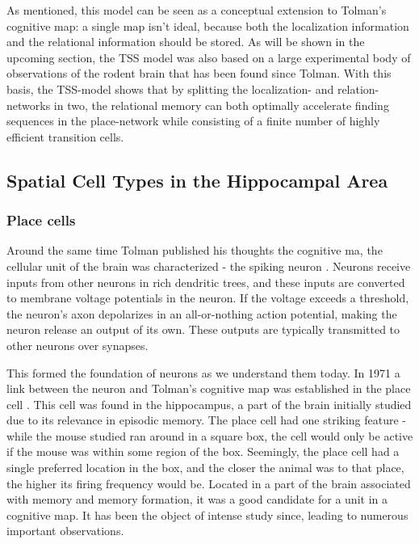 \documentclass{article}
\begin{document}
    As mentioned, this model can be seen as a conceptual extension to Tolman's cognitive map: a single map isn't ideal, because both the localization information and the relational information should be stored. As will be shown in the upcoming section, the TSS model was also based on a large experimental body of observations of the rodent brain that has been found since Tolman. With this basis, the TSS-model shows that by splitting the localization- and relation-networks in two, the relational memory can both optimally accelerate finding sequences in the place-network while consisting of a finite number of highly efficient transition cells.

    \subsection{Spatial Cell Types in the Hippocampal Area} \label{Spatial Cell}
    
    \subsubsection{Place cells} \label{place cells}
    Around the same time Tolman published his thoughts the cognitive ma, the cellular unit of the brain was characterized - the spiking neuron \parencite{Hodgkin1952}. Neurons receive inputs from other neurons in rich dendritic trees, and these inputs are converted to membrane voltage potentials in the neuron. If the voltage exceeds a threshold, the neuron's axon depolarizes in an all-or-nothing action potential, making the neuron release an output of its own. These outputs are typically transmitted to other neurons over synapses.

    This formed the foundation of neurons as we understand them today. In 1971 a link between the neuron and Tolman's cognitive map was established in the place cell \parencite{OKeefe1971,OKeefe1976}. This cell was found in the hippocampus, a part of the brain initially studied due to its relevance in episodic memory. The place cell had one striking feature - while the mouse studied ran around in a square box, the cell would only be active if the mouse was within some region of the box. Seemingly, the place cell had a single preferred location in the box, and the closer the animal was to that place, the higher its firing frequency would be. Located in a part of the brain associated with memory and memory formation, it was a good candidate for a unit in a cognitive map. It has been the object of intense study since, leading to numerous important observations.
\end{document}
